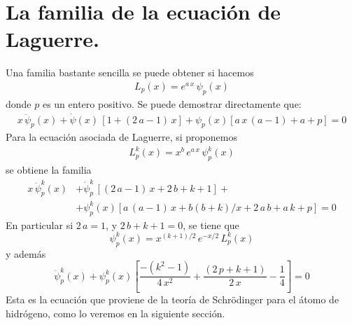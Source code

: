 \section{La familia de la ecuación de Laguerre.}
Una familia bastante sencilla se puede obtener si hacemos
\begin{align*}
L_{p} (x) = e^{a \, x} \, \psi_{p} (x)
\end{align*}
donde $p$ es un entero positivo. Se puede demostrar directamente que:
\begin{align*}
x \, \ddot{\psi}_{p} (x) + \dot{\psi} (x) \, [1 + (2 \, a -1) \, x] + \psi_{p} (x) [a \, x \, (a - 1) + a + p] = 0
\end{align*}
Para la ecuación asociada de Laguerre, si proponemos
\begin{align*}
L_{p}^{k} (x) = x^{b} \, e^{a \, x} \, \psi_{p}^{k} (x)
\end{align*}
se obtiene la familia
\begin{align*}
x \, \ddot{\psi}_{p}^{k} (x) &+ \dot{\psi}_{p}^{k} \, [(2 \, a - 1) \, x  + 2 \, b + k + 1] + \\
&+ \psi_{p}^{k} (x) [ a \, (a - 1) \, x + b (b + k) / x + 2 \, a \, b + a \, k + p] = 0
\end{align*}
En particular si $2 \, a = 1$, y $ 2 \, b + k + 1 = 0$, se tiene que
\begin{equation}
\psi_{p}^{k} (x) = x^{(k+1)/2} \, e^{-x/2} \, L_{p}^{k} (x)
\label{eq:ecuacion_08_80}
\end{equation}
y además
\begin{equation}
\ddot{\psi}_{p}^{k} (x) + \psi_{p}^{k} (x) \left[ \dfrac{-(k^{2} - 1)}{4 \, x^{2}} + \dfrac{(2 \, p + k + 1)}{2 \, x} - \dfrac{1}{4} \right] = 0
\label{eq:ecuacion_08_81}
\end{equation}
Esta es la ecuación que proviene de la teoría de Schrödinger para el átomo de hidrógeno, como lo veremos en la siguiente sección.

